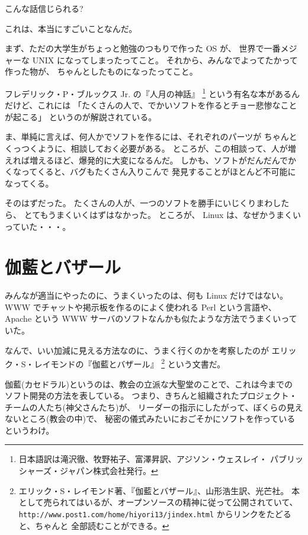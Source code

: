 \documentclass[11pt]{jarticle}
\begin{document}
\bigskip

こんな話信じられる?

\bigskip

これは、本当にすごいことなんだ。

まず、ただの大学生がちょっと勉強のつもりで作った OS が、
世界で一番メジャーな UNIX になってしまったってこと。
それから、みんなでよってたかって作った物が、
ちゃんとしたものになったってこと。

\bigskip

フレデリック・P・ブルックス Jr. の『人月の神話』
\footnote{日本語訳は滝沢徹、牧野祐子、富澤昇訳、アジソン・ウェスレイ・
パブリッシャーズ・ジャパン株式会社発行。}
という有名な本があるんだけど、これには
「たくさんの人で、でかいソフトを作るとチョー悲惨なことが起こる」
というのが解説されている。

ま、単純に言えば、何人かでソフトを作るには、それぞれのパーツが
ちゃんとくっつくように、相談しておく必要がある。
ところが、この相談って、人が増えれば増えるほど、爆発的に大変になるんだ。
しかも、ソフトがだんだんでかくなってくると、バグもたくさん入りこんで
発見することがほとんど不可能になってくる。

\bigskip

そのはずだった。
たくさんの人が、一つのソフトを勝手にいじくりまわしたら、
とてもうまくいくはずはなかった。
ところが、 Linux は、なぜかうまくいっていた・・・。

\section{伽藍とバザール}

みんなが適当にやったのに、うまくいったのは、何も Linux だけではない。
 WWW でチャットや掲示板を作るのによく使われる Perl という言語や、
 Apache という WWW サーバのソフトなんかも似たような方法でうまくいっていた。

なんで、いい加減に見える方法なのに、うまく行くのかを考察したのが
エリック・S・レイモンドの『伽藍とバザール』
\footnote{エリック・S・レイモンド著、『伽藍とバザール』、山形浩生訳、光芒社。
本として売られてはいるが、オープンソースの精神に従って公開されていて、
 \texttt{http://www.post1.com/home/hiyori13/jindex.html} からリンクをたどると、ちゃんと
全部読むことができる。}
という文書だ。

伽藍(カセドラル)というのは、教会の立派な大聖堂のことで、これは今までの
ソフト開発の方法を表している。
つまり、きちんと組織されたプロジェクト・チームの人たち(神父さんたち)が、
リーダーの指示にしたがって、ぼくらの見えないところ(教会の中)で、
秘密の儀式みたいにおごそかにソフトを作っているというわけ。
\end{document}
